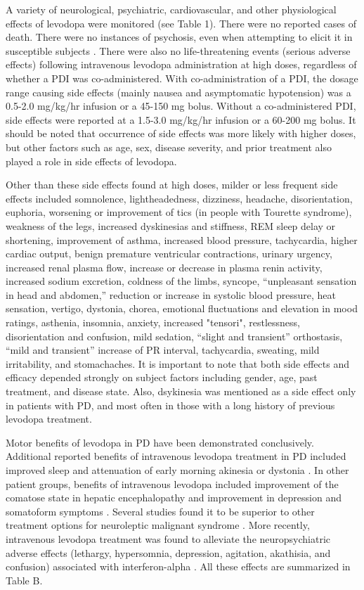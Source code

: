 A variety of neurological, psychiatric, cardiovascular, and other physiological effects of levodopa  were monitored (see Table 1). There were no reported cases of death.  There were no instances of psychosis, even when attempting to elicit it in susceptible subjects \cite{9748031}.  There were also no life-threatening events (serious adverse effects) following intravenous levodopa administration at high doses, regardless of whether a PDI was co-administered.  With co-administration of a PDI, the dosage range causing side effects (mainly nausea and asymptomatic hypotension) was a 0.5-2.0 mg/kg/hr infusion or a 45-150 mg bolus.  Without a co-administered PDI, side effects were reported at a 1.5-3.0 mg/kg/hr infusion or a 60-200 mg bolus. It should be noted that occurrence of side effects was more likely with higher doses, but other factors such as age, sex, disease severity, and prior treatment also played a role in side effects of levodopa.  

Other than these side effects found at high doses, milder or less frequent side effects included somnolence, lightheadedness, dizziness, headache, disorientation, euphoria, worsening or improvement of tics (in people with Tourette syndrome), weakness of the legs, increased dyskinesias and stiffness, REM sleep delay or shortening, improvement of asthma, increased blood pressure, tachycardia, higher cardiac output, benign premature ventricular contractions, urinary urgency, increased renal plasma flow, increase or decrease in plasma renin activity, increased sodium excretion, coldness of the limbs, syncope, “unpleasant sensation in head and abdomen,” reduction or increase in systolic blood pressure, heat sensation, vertigo, dystonia, chorea, emotional fluctuations and elevation in mood ratings, asthenia, insomnia, anxiety, increased "tensori", restlessness, disorientation and confusion, mild sedation, “slight and transient” orthostasis, “mild and transient” increase of PR interval, tachycardia, sweating, mild irritability, and stomachaches.  It is important to note that both side effects and efficacy depended strongly on subject factors including gender, age, past treatment, and disease state.  Also, dsykinesia was mentioned as a side effect only in patients with PD, and most often in those with a long history of previous levodopa treatment.

Motor benefits of levodopa in PD have been demonstrated conclusively. Additional reported benefits of intravenous levodopa treatment in PD included improved sleep \cite{6722513} and attenuation of early morning akinesia or dystonia \cite{3601092}.  In other patient groups, benefits of intravenous levodopa included improvement of the comatose state in hepatic encephalopathy \cite{4544184} and improvement in depression and somatoform symptoms \cite{5898634}.  Several studies found it to be superior to other treatment options for neuroleptic malignant syndrome \cite{9099421}.  More recently, intravenous levodopa treatment was found to alleviate the neuropsychiatric adverse effects (lethargy, hypersomnia, depression, agitation, akathisia, and confusion) associated with interferon-alpha \cite{10682234}. All these effects are summarized in Table B.